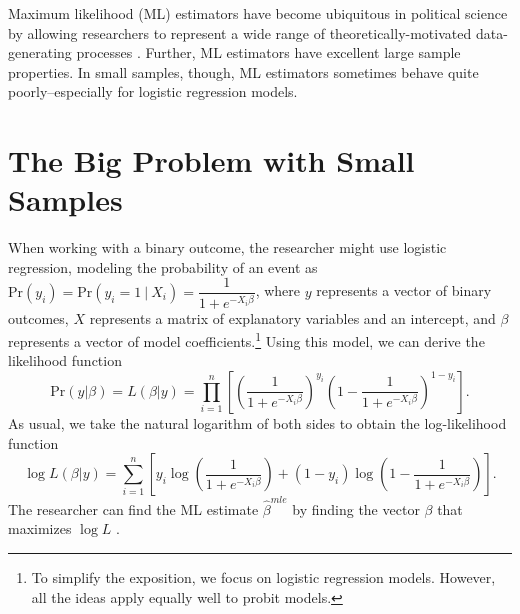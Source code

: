 \documentclass[12pt]{article}
\begin{document}
\thispagestyle{empty}

\newpage
\onehalfspace

Maximum likelihood (ML) estimators have become ubiquitous in political science by allowing researchers to represent a wide range of theoretically-motivated data-generating processes \citep{King1989}.
Further, ML estimators have excellent large sample properties. 
In small samples, though, ML estimators sometimes behave quite poorly--especially for logistic regression models.

\section*{The Big Problem with Small Samples}

When working with a binary outcome, the researcher might use logistic regression, modeling the probability of an event as $\text{Pr}(y_i) = \text{Pr}(y_i = 1~|~ X_i) = \dfrac{1}{1 + e^{-X_i\beta}}$, where $y$ represents a vector of binary outcomes, $X$ represents a matrix of explanatory variables and an intercept, and $\beta$ represents a vector of model coefficients.\footnote{To simplify the exposition, we focus on logistic regression models. However, all the ideas apply equally well to probit models.}
Using this model, we can derive the likelihood function
\begin{equation}\nonumber
\text{Pr}(y | \beta) = L(\beta | y) = \displaystyle \prod_{i = 1}^n \left[\left( \dfrac{1}{1 + e^{-X_i\beta}}\right)^{y_i}\left(1- \dfrac{1}{1 + e^{-X_i\beta}}\right)^{1 - y_i}\right]\text{.}
\end{equation}
\noindent As usual, we take the natural logarithm of both sides to obtain the log-likelihood function
\begin{equation}\nonumber
\log L(\beta | y) = \displaystyle \sum_{i = 1}^n \left[y_i \log \left( \dfrac{1}{1 + e^{-X_i\beta}}\right) + (1 - y_i) \log \left(1- \dfrac{1}{1 + e^{-X_i\beta}}\right)\right].
\end{equation}
\noindent The researcher can find the ML estimate $\hat{\beta}^{mle}$ by finding the vector $\beta$ that maximizes $\log L$ \citep{King1989}.
\end{document}
